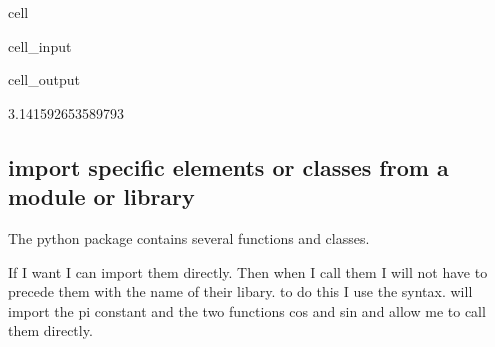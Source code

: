 \documentclass[letterpaper,10pt,english]{jupyterBook}
\begin{document}
\begin{sphinxuseclass}{cell}\begin{sphinxVerbatimInput}

\begin{sphinxuseclass}{cell_input}
\begin{sphinxVerbatim}[commandchars=\\\{\}]
 

\end{sphinxVerbatim}

\end{sphinxuseclass}\end{sphinxVerbatimInput}
\begin{sphinxVerbatimOutput}

\begin{sphinxuseclass}{cell_output}
\begin{sphinxVerbatim}[commandchars=\\\{\}]
3.141592653589793
\end{sphinxVerbatim}

\end{sphinxuseclass}\end{sphinxVerbatimOutput}

\end{sphinxuseclass}

\subsection{import specific elements or classes from a module or library}
\label{\detokenize{content/04_PythonEssentials/PythonPackagesEtc:import-specific-elements-or-classes-from-a-module-or-library}}
\sphinxAtStartPar
The python package  contains several functions and classes.

\sphinxAtStartPar
If I want I can import them directly. Then when I call them I will not have to precede them with the name of their libary. to do this I use the  syntax.   will import the pi constant and the two functions cos and sin and allow me to call them directly.
\end{document}

